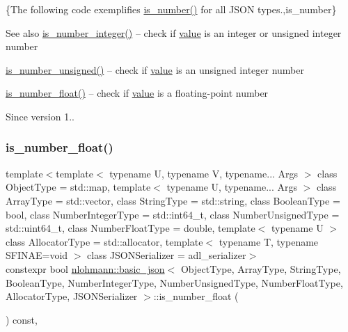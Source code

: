 \{The following code exemplifies {\ttfamily \mbox{\hyperlink{classnlohmann_1_1basic__json_a2b9852390abb4b1ef5fac6984e2fc0f3}{is\+\_\+number()}}} for all J\+S\+ON types.,is\+\_\+number\}

\begin{DoxySeeAlso}{See also}
\mbox{\hyperlink{classnlohmann_1_1basic__json_abac8af76067f1e8fdca9052882c74428}{is\+\_\+number\+\_\+integer()}} -- check if \mbox{\hyperlink{classnlohmann_1_1basic__json_adcf8ca5079f5db993820bf50036bf45d}{value}} is an integer or unsigned integer number 

\mbox{\hyperlink{classnlohmann_1_1basic__json_abc7378cba0613a78b9aad1c8e7044bb0}{is\+\_\+number\+\_\+unsigned()}} -- check if \mbox{\hyperlink{classnlohmann_1_1basic__json_adcf8ca5079f5db993820bf50036bf45d}{value}} is an unsigned integer number 

\mbox{\hyperlink{classnlohmann_1_1basic__json_a33b4bf898b857c962e798fc7f6e86e70}{is\+\_\+number\+\_\+float()}} -- check if \mbox{\hyperlink{classnlohmann_1_1basic__json_adcf8ca5079f5db993820bf50036bf45d}{value}} is a floating-\/point number
\end{DoxySeeAlso}
\begin{DoxySince}{Since}
version 1.. 
\end{DoxySince}
\mbox{\label{classnlohmann_1_1basic__json_a33b4bf898b857c962e798fc7f6e86e70}} 
\subsubsection{\texorpdfstring{is\+\_\+number\+\_\+float()}{is\_number\_float()}}
{\footnotesize\ttfamily template$<$template$<$ typename U, typename V, typename... Args $>$ class Object\+Type = std\+::map, template$<$ typename U, typename... Args $>$ class Array\+Type = std\+::vector, class String\+Type  = std\+::string, class Boolean\+Type  = bool, class Number\+Integer\+Type  = std\+::int64\+\_\+t, class Number\+Unsigned\+Type  = std\+::uint64\+\_\+t, class Number\+Float\+Type  = double, template$<$ typename U $>$ class Allocator\+Type = std\+::allocator, template$<$ typename T, typename S\+F\+I\+N\+A\+E=void $>$ class J\+S\+O\+N\+Serializer = adl\+\_\+serializer$>$ \\
constexpr bool \mbox{\hyperlink{classnlohmann_1_1basic__json}{nlohmann\+::basic\+\_\+json}}$<$ Object\+Type, Array\+Type, String\+Type, Boolean\+Type, Number\+Integer\+Type, Number\+Unsigned\+Type, Number\+Float\+Type, Allocator\+Type, J\+S\+O\+N\+Serializer $>$\+::is\+\_\+number\+\_\+float (\begin{DoxyParamCaption}{ }\end{DoxyParamCaption}) const\hspace{0.3cm}{\ttfamily [inline]}, {\ttfamily [noexcept]}}



